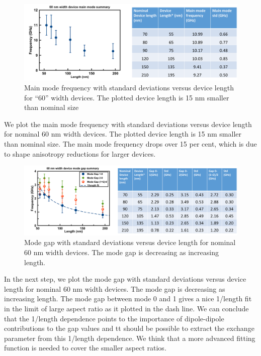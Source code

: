 \begin{figure}[!ht]
  \centering
  \includegraphics[width=1.0\textwidth]{fig/stadium/60modesummary}
   \caption{Main mode frequency with standard deviations versus device length for “60” width devices. The plotted device length is 15 nm smaller than nominal size}
  \label{fig:60modesummary}
\end{figure}
 
We plot the main mode frequency with standard deviations versus device length for nominal 60 nm width devices. The plotted device length is 15 nm smaller than nominal size. The main mode frequency drops over 15 per cent, which is due to shape anisotropy reductions for larger devices.


\begin{figure}[!ht]
  \centering
  \includegraphics[width=1.0\textwidth]{fig/stadium/60nmgapsummary}
   \caption{Mode gap with standard deviations versus device length for nominal 60 nm width devices. The mode gap is decreasing as increasing length.}
  \label{fig:60nmgapsummary}
\end{figure}

In the next step, we plot the mode gap with standard deviations versus device length for nominal 60 nm width devices. The mode gap is decreasing as increasing length. The mode gap between mode 0 and 1 gives a nice 1/length fit in the limit of large aspect ratio as it plotted in the dash line. We can conclude that the 1/length dependence points to the importance of dipole-dipole contributions to the gap values and tt should be possible to extract the exchange parameter from this 1/length dependence. We think that a more advanced fitting function is needed to cover the smaller aspect ratios.

